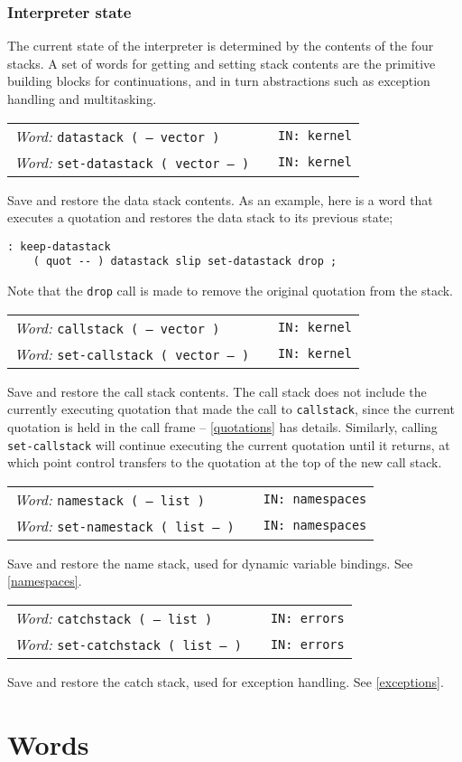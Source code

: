 \documentclass{report}
\newcommand{\ordinaryword}[3]{\index{#1}
\emph{Word:} \texttt{#2} &&\texttt{IN: #3}}
\newcommand{\wordtable}[1]{

\begin{tabularx}{12cm}[t]{lXr}
\hline
#1\\
\hline
\end{tabularx}

}
\begin{document}
\subsubsection{Interpreter state}

The current state of the interpreter is determined by the contents of the four stacks. A set of words for getting and setting stack contents are the primitive building blocks for continuations, and in turn abstractions such as exception handling and multitasking.
\wordtable{
\ordinaryword{datastack}{datastack ( -- vector )}{kernel}\\
\ordinaryword{set-datastack}{set-datastack ( vector -- )}{kernel}
}
Save and restore the data stack contents. As an example, here is a word that executes a quotation and restores the data stack to its previous state;
\begin{verbatim}
: keep-datastack
    ( quot -- ) datastack slip set-datastack drop ;
\end{verbatim}
Note that the \texttt{drop} call is made to remove the original quotation from the stack.
\wordtable{
\ordinaryword{callstack}{callstack ( -- vector )}{kernel}\\
\ordinaryword{set-callstack}{set-callstack ( vector -- )}{kernel}
}
Save and restore the call stack contents. The call stack does not include the currently executing quotation that made the call to \texttt{callstack}, since the current quotation is held in the call frame -- \ref{quotations} has details. Similarly, calling \texttt{set-callstack} will continue executing the current quotation until it returns, at which point control transfers to the quotation at the top of the new call stack.
\wordtable{
\ordinaryword{namestack}{namestack ( -- list )}{namespaces}\\
\ordinaryword{set-namestack}{set-namestack ( list -- )}{namespaces}
}
Save and restore the name stack, used for dynamic variable bindings. See \ref{namespaces}.
\wordtable{
\ordinaryword{catchstack}{catchstack ( -- list )}{errors}\\
\ordinaryword{set-catchstack}{set-catchstack ( list -- )}{errors}
}
Save and restore the catch stack, used for exception handling. See \ref{exceptions}.

\section{\label{words}Words}
\end{document}
